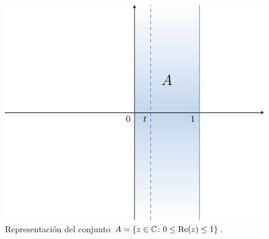 \documentclass[a4paper, 12pt]{book}
\begin{document}
\begin{figure}[H]
  \centering
  \includegraphics{./plot17/main.pdf}
  \caption{Representación del conjunto $A = \{z \in \mathbb C \colon 0 \leq \textup{Re}(z) \leq 1\}$.}
\end{figure}
\end{document}

